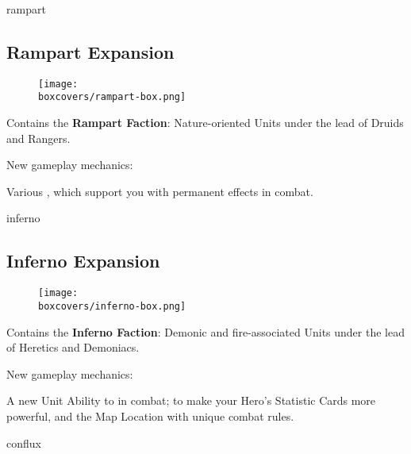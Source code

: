 \begin{multicols}{2}
\columnbreak
\begin{expansion}[title=]{rampart}
  \subsection*{\color{rampart}Rampart Expansion}
  \setlength\intextsep{0pt}
  \setlength\columnsep{0.8em}
  \begin{wrapfigure}{l}{0.35\textwidth}
    \texttt{[image: \\boxcovers/rampart-box.png]}
  \end{wrapfigure}
  Contains the \textbf{Rampart Faction}: Nature-oriented Units under the lead of Druids and Rangers.\par
  \medskip
  New gameplay mechanics:\par
  \smallskip
  Various , which support you with permanent effects in combat.
\end{expansion}

\vspace*{1em}
\begin{expansion}[title=]{inferno}
  \subsection*{\color{inferno}Inferno Expansion}
  \setlength\intextsep{0pt}
  \setlength\columnsep{0.8em}
  \begin{wrapfigure}{l}{0.35\textwidth}
    \texttt{[image: \\boxcovers/inferno-box.png]}
  \end{wrapfigure}
  Contains the \textbf{Inferno Faction}: Demonic and fire-associated Units under the lead of Heretics and Demoniacs.\par
  \medskip
  New gameplay mechanics:\par
  \smallskip
  A new Unit Ability to  in combat;  to make your Hero's Statistic Cards more powerful, and the  Map Location with unique combat rules.
\end{expansion}

\vspace*{1em}
\begin{expansion}[title=]{conflux}

\end{expansion}
\end{multicols}
